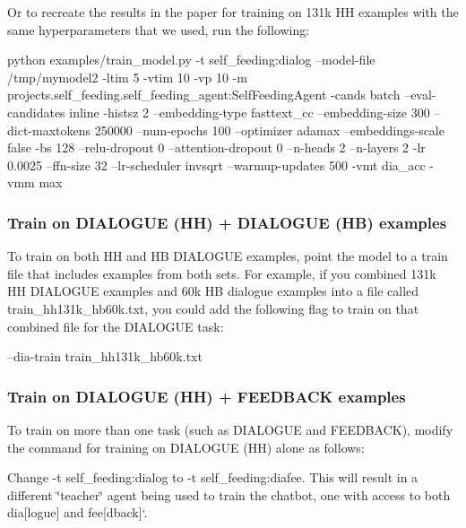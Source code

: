 Or to recreate the results in the paper for training on 131k HH examples with the same hyperparameters that we used, run the following\+:


\begin{DoxyCode}
python examples/train\_model.py -t self\_feeding:dialog --model-file /tmp/mymodel2 -ltim 5 -vtim 10 -vp 10 -m
       projects.self\_feeding.self\_feeding\_agent:SelfFeedingAgent -cands batch --eval-candidates inline -histsz 2
       --embedding-type fasttext\_cc --embedding-size 300 --dict-maxtokens 250000 --num-epochs 100 --optimizer adamax
       --embeddings-scale false -bs 128 --relu-dropout 0 --attention-dropout 0 --n-heads 2 --n-layers 2 -lr 0.0025
       --ffn-size 32 --lr-scheduler invsqrt --warmup-updates 500 -vmt dia\_acc -vmm max
\end{DoxyCode}


\subsubsection*{Train on D\+I\+A\+L\+O\+G\+UE (HH) + D\+I\+A\+L\+O\+G\+UE (HB) examples}

To train on both HH and HB D\+I\+A\+L\+O\+G\+UE examples, point the model to a train file that includes examples from both sets. For example, if you combined 131k HH D\+I\+A\+L\+O\+G\+UE examples and 60k HB dialogue examples into a file called {\ttfamily train\+\_\+hh131k\+\_\+hb60k.\+txt}, you could add the following flag to train on that combined file for the D\+I\+A\+L\+O\+G\+UE task\+:


\begin{DoxyCode}
--dia-train train\_hh131k\_hb60k.txt
\end{DoxyCode}


\subsubsection*{Train on D\+I\+A\+L\+O\+G\+UE (HH) + F\+E\+E\+D\+B\+A\+CK examples}

To train on more than one task (such as D\+I\+A\+L\+O\+G\+UE and F\+E\+E\+D\+B\+A\+CK), modify the command for training on D\+I\+A\+L\+O\+G\+UE (HH) alone as follows\+:


\begin{DoxyItemize}
\item Change {\ttfamily -\/t self\+\_\+feeding\+:dialog} to {\ttfamily -\/t self\+\_\+feeding\+:diafee}. This will result in a different \char`\"{}teacher\char`\"{} agent being used to train the chatbot, one with access to both \textquotesingle{}dia\mbox{[}logue\mbox{]}\textquotesingle{} and \textquotesingle{}fee\mbox{[}dback\mbox{]}`.
\end{DoxyItemize}

